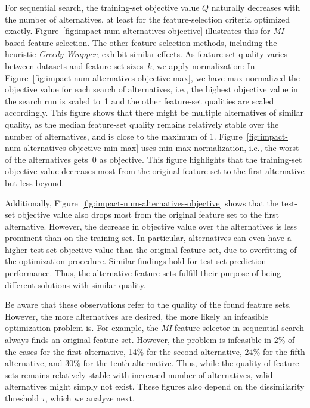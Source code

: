 \documentclass{article}
\theoremstyle{definition}
\begin{document}
For sequential search, the training-set objective value $Q$ naturally decreases with the number of alternatives, at least for the feature-selection criteria optimized exactly.
Figure~\ref{fig:impact-num-alternatives-objective} illustrates this for \emph{MI}-based feature selection.
The other feature-selection methods, including the heuristic \emph{Greedy Wrapper}, exhibit similar effects.
As feature-set quality varies between datasets and feature-set sizes~$k$, we apply normalization:
In Figure~\ref{fig:impact-num-alternatives-objective-max}, we have max-normalized the objective value for each search of alternatives, i.e., the highest objective value in the search run is scaled to~1 and the other feature-set qualities are scaled accordingly.
This figure shows that there might be multiple alternatives of similar quality, as the median feature-set quality remains relatively stable over the number of alternatives, and is close to the maximum of 1.
Figure~\ref{fig:impact-num-alternatives-objective-min-max} uses min-max normalization, i.e., the worst of the alternatives gets~0 as objective.
This figure highlights that the training-set objective value decreases most from the original feature set to the first alternative but less beyond.

Additionally, Figure~\ref{fig:impact-num-alternatives-objective} shows that the test-set objective value also drops most from the original feature set to the first alternative.
However, the decrease in objective value over the alternatives is less prominent than on the training set.
In particular, alternatives can even have a higher test-set objective value than the original feature set, due to overfitting of the optimization procedure.
Similar findings hold for test-set prediction performance.
Thus, the alternative feature sets fulfill their purpose of being different solutions with similar quality.

Be aware that these observations refer to the quality of the found feature sets.
However, the more alternatives are desired, the more likely an infeasible optimization problem is.
For example, the \emph{MI} feature selector in sequential search always finds an original feature set.
However, the problem is infeasible in 2\% of the cases for the first alternative, 14\% for the second alternative, 24\% for the fifth alternative, and 30\% for the tenth alternative.
Thus, while the quality of feature-sets remains relatively stable with increased number of alternatives, valid alternatives might simply not exist.
These figures also depend on the dissimilarity threshold $\tau$, which we analyze next.
\end{document}

